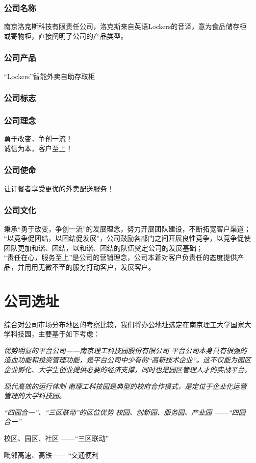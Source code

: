 \documentclass[violet]{main}
\begin{document}
			\subsubsection{公司名称}
				南京洛克斯科技有限责任公司，洛克斯来自英语Lockers的音译，意为食品储存柜或寄物柜，直接阐明了公司的产品类型。
			\subsubsection{公司产品}
				“Lockers”智能外卖自助存取柜
			\subsubsection{公司标志}
				\begin{center}
					\Tcbset{}
				\end{center}
			\subsubsection{公司理念}
				勇于改变，争创一流！
				\\\indent 诚信为本，客户至上！
			\subsubsection{公司使命}
				让订餐者享受更优的外卖配送服务！
			\subsubsection{公司文化}
				秉承“勇于改变，争创一流”的发展理念，努力开展团队建设，不断拓宽客户渠道；
				\\\indent “以竞争促团结，以团结促发展”，公司鼓励各部门之间开展良性竞争，以竞争促使团队更加和谐、团结，以和谐、团结的队伍奠定公司的发展基础；
				\\\indent “责任在心，服务至上”是公司的营销理念，公司本着对客户负责任的态度提供产品，并用用无微不至的服务打动客户，发展客户。
		\section{公司选址}
			综合对公司市场分布地区的考察比较，我们将办公地址选定在南京理工大学国家大学科技园，主要基于如下考虑：
			\begin{strength0}{\it 优势明显的平台公司——南京理工科技园股份有限公司}{}
				\it 平台公司本身具有很强的造血功能和投资管理功能，是平台公司中少有的“高新技术企业”。这不仅能为园区企业孵化、大学生创业提供必要的经济支撑，同时也是园区管理人才的实战平台。
			\end{strength0}
			\begin{strength0}{\it 现代高效的运行体制}{}
				\it 南理工科技园是典型的校府合作模式，是定位于企业化运营管理的大学科技园。
			\end{strength0}
			\begin{strength0}{\it “四园合一”、“三区联动”的区位优势}{}
				\it 校园、创新园、服务园、产业园 ——“四园合一”
				\par 校区、园区、社区 ——“三区联动”
				\par 毗邻高速、高铁—— “交通便利
			\end{strength0}
\end{document}
